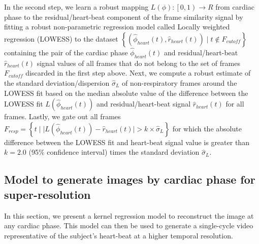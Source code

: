 \documentclass[runningheads,a4paper]{llncs}
\begin{document}
	In the second step, we learn a robust mapping $L(\phi) : \left [  0, 1\right ) \to R$ from cardiac phase to the residual/heart-beat component of the frame similarity signal by fitting a robust non-parametric regression model called Locally weighted regression (LOWESS) to the dataset $\left \{ \left(\hat{\phi}_{heart}(t), \hat{r}_{heart}(t) \right) \mid t \notin F_{cutoff}  \right \}$ containing the pair of the cardiac phase $\hat{\phi}_{heart}(t)$ and residual/heart-beat $\hat{r}_{heart}(t)$ signal values of all frames that do not belong to the set of frames $F_{cutoff}$ discarded in the first step above. Next, we compute a robust estimate of the standard deviation/dispersion $\hat{\sigma}_{L}$ of non-respiratory frames around the LOWESS fit based on the median absolute value of the difference between the LOWESS fit $L( \hat{\phi}_{heart}(t) )$ and residual/heart-beat signal $\hat{r}_{heart}(t)$ for all frames. Lastly, we gate out all frames $F_{resp} = \left \{ t \; \big\lvert \; \lvert L( \hat{\phi}_{heart}(t) ) - \hat{r}_{heart}(t)  \rvert   > k \times \hat{\sigma}_{L}  \right \}$ for which the absolute  difference between the LOWESS fit and heart-beat signal value is greater than $k = 2.0$ (95\% confidence interval) times the standard deviation $\hat{\sigma}_{L}$.	
%
\vspace{-0.5cm}
\subsection{Model to generate images by cardiac phase for super-resolution}
\label{sec:method:super_resolution}
%
In this section, we present a kernel regression model to reconstruct the image at any cardiac phase. This model can then be used to generate a single-cycle video representative of the subject's heart-beat at a higher temporal resolution.
\end{document}
